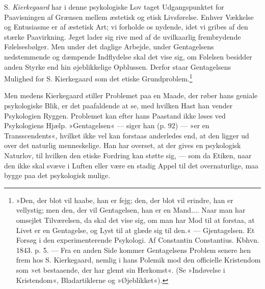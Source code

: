 \documentclass[12pt,a4paper,openany]{book}
\newcommand{\opage}[1]{\marginnote{\footnotesize\textit{[#1]}}}
\begin{document}
S. \emph{Kierkegaard} har i denne psykologiske Lov taget Udgangspunktet
for Paavisningen af Grænsen mellem æstetisk og etisk Livsførelse. Enhver
Vækkelse og Entusiasme er af æstetisk Art; vi forholde os nydende, idet
vi gribes af den stærke Paavirkning. Jeget lader sig rive med af de
uvilkaarlig frembrydende Følelsesbølger. Men under det daglige Arbejde,
under Gentagelsens nedstemmende og dæmpende Indflydelse skal det vise
sig, om Følelsen besidder anden Styrke end hin øjeblikkelige Opblussen.
Derfor staar Gentagelsens Mulighed for S. Kierkegaard som det etiske
Grundproblem.\footnote[1]{»Den, der blot vil haabe, han er fejg; den,
der blot vil erindre, han er vellystig; men den, der vil Gentagelsen,
han er en Mand.... Naar man har omsejlet Tilværelsen, da skal det vise
sig, om man har Mod til at forstaa, at Livet er en Gentagelse, og Lyst
til at glæde sig til den.« --- Gjentagelsen. Et Forsøg i den
experimenterende Psykologi. Af Constantin Constantius. Kbhvn. 1843. p.
5. --- Fra en anden Side kommer Gentagelsens Problem senere hen frem hos
S. Kierkegaard, nemlig i hans Polemik mod den officielle Kristendom som
»et bestaaende, der har glemt sin Herkomst«. (Se »Indøvelse i
Kristendom«, Bladartiklerne og »Øjeblikket«).}


\opage{332}Men medens Kierkegaard stiller Problemet paa en Maade, der
røber hans geniale psykologiske Blik, er det paafaldende at se, med
hvilken Hast han vender Psykologien Ryggen. Problemet kan efter hans
Paastand ikke løses ved Psykologiens Hjælp. »Gentagelsen« --- siger han
(p. 92) --- »er en Transscendents«, hvilket ikke vel kan forstaas
anderledes end, at den ligger ud over det naturlig menneskelige. Han har
overset, at der gives en psykologisk Naturlov, til hvilken den etiske
Fordring kan støtte sig, --- som da Etiken, naar den ikke skal svæve i
Luften eller være en stadig Appel til det overnaturlige, maa bygge paa
det psykologisk mulige.
\end{document}
